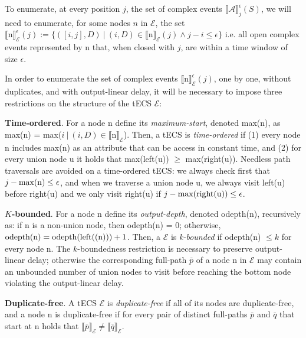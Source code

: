To enumerate, at every position $j$, the set of complex events ${\llbracket \mathcal{A} \rrbracket}^{\epsilon}_{j}(S)$, we will need to enumerate, for some nodes $n$ in $\mathcal{E}$, the set ${\llbracket \textrm{n} \rrbracket}^{\epsilon}_{\mathcal{E}}(j) := \{ ([i, j], D) \ | \ (i, D) \in {\llbracket \textrm{n} \rrbracket}_{\mathcal{E}}(j) \land j - i \leq \epsilon \}$ i.e. all open complex events represented by \textrm{n} that, when closed with $j$, are within a time window of size $\epsilon$.

In order to enumerate the set of complex events ${\llbracket \textrm{n} \rrbracket}^{\epsilon}_{\mathcal{E}}(j)$, one by one, without duplicates, and with output-linear delay, it will be necessary to impose three restrictions on the structure of the tECS $\mathcal{E}$:

\textbf{Time-ordered}. For a node \textrm{n} define its \emph{maximum-start}, denoted max(\textrm{n}), as max(\textrm{n}) = max(${ i \ | \ (i, D) \in {\llbracket \textrm{n} \rrbracket}_{\mathcal{E}}}$). Then, a tECS is \emph{time-ordered} if (1) every node \textrm{n} includes max(\textrm{n}) as an attribute that can be access in constant time, and (2) for every union node \textrm{u} it holds that max(left(\textrm{u})) $\ge$ max(right(\textrm{u})). Needless path traversals are avoided on a time-ordered tECS: we always check first that $j - \text{max({\textrm{n}})} \le \epsilon$, and when we traverse a union node \textrm{u}, we always visit left(\textrm{u}) before right(\textrm{u}) and we only visit right(\textrm{u}) if $j - \text{max(right(\textrm{u}))} \le \epsilon$.

\textbf{$K$-bounded}. For a node \textrm{n} define its \emph{output-depth}, denoted odepth(\textrm{n}), recursively as: if \textrm{n} is a non-union node, then odepth(\textrm{n}) = 0; otherwise, $\text{odepth(\textrm{n})} = \text{odepth(left(\textrm(n)))} + 1$. Then, a $\mathcal{E}$ is \emph{k-bounded} if odepth(\textrm{n}) $\leq k$ for every node \textrm{n}. The $k$-boundedness restriction is necessary to preserve output-linear delay; otherwise the corresponding full-path $\bar{p}$ of a node \textrm{n} in $\mathcal{E}$ may contain an unbounded number of union nodes to visit before reaching the bottom node violating the output-linear delay.

\textbf{Duplicate-free}. A tECS $\mathcal{E}$ is \emph{duplicate-free} if all of its nodes are duplicate-free, and a node \textrm{n} is duplicate-free if for every pair of distinct full-paths $\bar{p}$ and $\bar{q}$ that start at \textrm{n} holds that ${\llbracket \bar{p} \rrbracket}_{\mathcal{E}} \ne {\llbracket \bar{q} \rrbracket}_{\mathcal{E}}$.
































